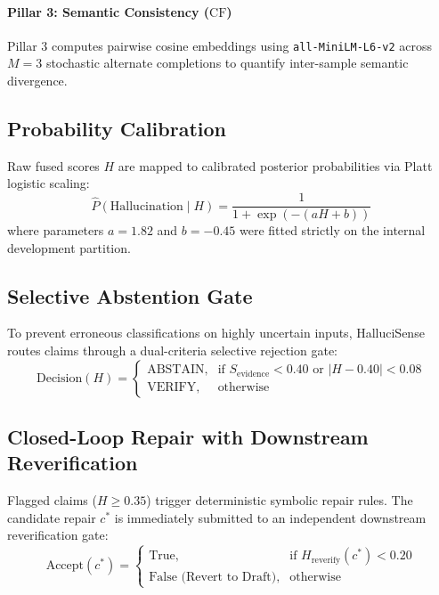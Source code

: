\documentclass[11pt,a4paper]{article}
\begin{document}
\paragraph{Pillar 3: Semantic Consistency ($\text{CF}$)}
Pillar 3 computes pairwise cosine embeddings using \texttt{all-MiniLM-L6-v2} across $M=3$ stochastic alternate completions to quantify inter-sample semantic divergence.

\subsection{Probability Calibration}
Raw fused scores $H$ are mapped to calibrated posterior probabilities via Platt logistic scaling:
\begin{equation}
\hat{P}(\text{Hallucination} \mid H) = \frac{1}{1 + \exp(-(a H + b))}
\end{equation}
where parameters $a = 1.82$ and $b = -0.45$ were fitted strictly on the internal development partition.

\subsection{Selective Abstention Gate}
To prevent erroneous classifications on highly uncertain inputs, HalluciSense routes claims through a dual-criteria selective rejection gate:
\begin{equation}
\text{Decision}(H) = 
\begin{cases}
\text{ABSTAIN}, & \text{if } S_{\text{evidence}} < 0.40 \text{ or } |H - 0.40| < 0.08 \\
\text{VERIFY}, & \text{otherwise}
\end{cases}
\end{equation}

\subsection{Closed-Loop Repair with Downstream Reverification}
Flagged claims ($H \ge 0.35$) trigger deterministic symbolic repair rules. The candidate repair $c^*$ is immediately submitted to an independent downstream reverification gate:
\begin{equation}
\text{Accept}(c^*) = 
\begin{cases}
\text{True}, & \text{if } H_{\text{reverify}}(c^*) < 0.20 \\
\text{False (Revert to Draft)}, & \text{otherwise}
\end{cases}
\end{equation}
\end{document}
